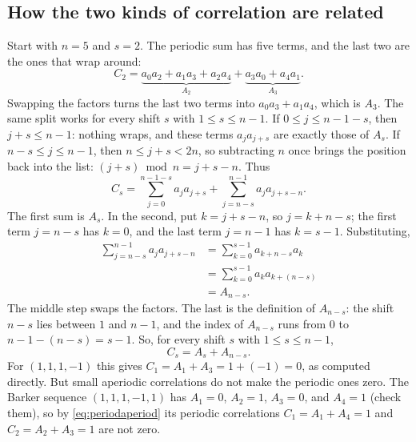 \subsection*{How the two kinds of correlation are related}
Start with $n=5$ and $s=2$. The periodic sum has five terms, and the last two are the ones that wrap around:
\[
 C_2=\underbrace{a_0a_2+a_1a_3+a_2a_4}_{A_2}
       +\underbrace{a_3a_0+a_4a_1}_{A_3}.
\]
Swapping the factors turns the last two terms into $a_0a_3+a_1a_4$, which is $A_3$. The same split works for every shift $s$ with $1\le s\le n-1$. If $0\le j\le n-1-s$, then $j+s\le n-1$: nothing wraps, and these terms $a_ja_{j+s}$ are exactly those of $A_s$. If $n-s\le j\le n-1$, then $n\le j+s<2n$, so subtracting $n$ once brings the position back into the list: $(j+s)\bmod n=j+s-n$. Thus
\[
 C_s=\sum_{j=0}^{n-1-s}a_j a_{j+s}
     +\sum_{j=n-s}^{n-1}a_j a_{j+s-n}.
\]
The first sum is $A_s$. In the second, put $k=j+s-n$, so $j=k+n-s$; the first term $j=n-s$ has $k=0$, and the last term $j=n-1$ has $k=s-1$. Substituting,
\begin{align*}
 \sum_{j=n-s}^{n-1}a_j a_{j+s-n}
 &=\sum_{k=0}^{s-1}a_{k+n-s}a_k\\
 &=\sum_{k=0}^{s-1}a_k a_{k+(n-s)}\\
 &=A_{n-s}.
\end{align*}
The middle step swaps the factors. The last is the definition of $A_{n-s}$: the shift $n-s$ lies between $1$ and $n-1$, and the index of $A_{n-s}$ runs from $0$ to $n-1-(n-s)=s-1$. So, for every shift $s$ with $1\le s\le n-1$,
\begin{equation}
C_s=A_s+A_{n-s}.\label{eq:periodaperiod}
\end{equation}
For $(1,1,1,-1)$ this gives $C_1=A_1+A_3=1+(-1)=0$, as computed directly. But small aperiodic correlations do not make the periodic ones zero. The Barker sequence $(1,1,1,-1,1)$ has $A_1=0$, $A_2=1$, $A_3=0$, and $A_4=1$ (check them), so by \eqref{eq:periodaperiod} its periodic correlations $C_1=A_1+A_4=1$ and $C_2=A_2+A_3=1$ are not zero.

